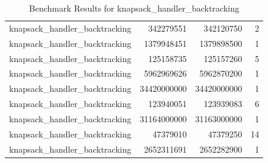 \documentclass{llncs}
\begin{document}
\begin{table}[ht]
\begin{tabular}{@{}lrrr@{}}
        knapsack\_handler\_backtracking & 342279551 & 342120750 & 2 \\
        knapsack\_handler\_backtracking & 1379948451 & 1379898500 & 1 \\
        knapsack\_handler\_backtracking & 125158735 & 125157260 & 5 \\
        knapsack\_handler\_backtracking & 5962969626 & 5962870200 & 1 \\
        knapsack\_handler\_backtracking & 34420000000 & 34420000000 & 1 \\
        knapsack\_handler\_backtracking & 123940051 & 123939083 & 6 \\
        knapsack\_handler\_backtracking & 31164000000 & 31163000000 & 1 \\
        knapsack\_handler\_backtracking & 47379010 & 47379250 & 14 \\
        knapsack\_handler\_backtracking & 2652311691 & 2652282900 & 1 \\
        \bottomrule
    \end{tabular}
    \caption{Benchmark Results for knapsack\_handler\_backtracking}
\end{table}
\clearpage
\end{document}
